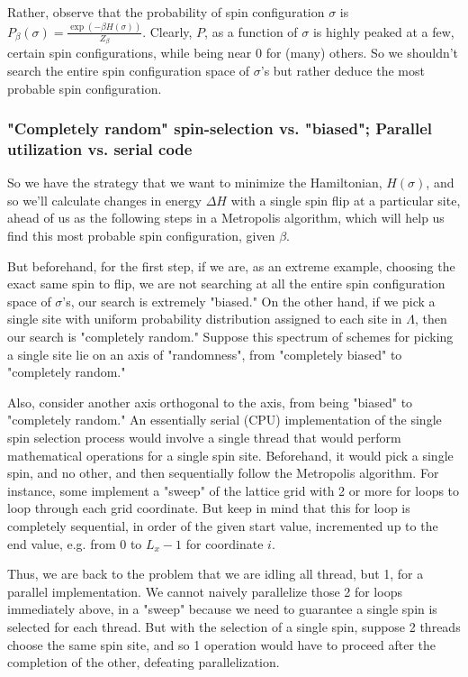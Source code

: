 \documentclass[10pt]{amsart}
\begin{document}
\begin{multicols*}{2}
Rather, observe that the probability of spin configuration $\sigma$ is $P_{\beta}(\sigma) = \frac{\exp{ (-\beta H(\sigma))} }{ Z_{\beta}}$.  Clearly, $P$, as a function of $\sigma$ is highly peaked at a few, certain spin configurations, while being near 0 for (many) others.  So we shouldn't search the entire spin configuration space of $\sigma$'s but rather deduce the most probable spin configuration.  

\subsubsection{"Completely random" spin-selection vs. "biased"; Parallel utilization vs. serial code}

So we have the strategy that we want to minimize the Hamiltonian, $H(\sigma)$, and so we'll calculate changes in energy $\Delta H$ with a single spin flip at a particular site, ahead of us as the following steps in a Metropolis algorithm, which will help us find this most probable spin configuration, given $\beta$.  

But beforehand, for the first step, if we are, as an extreme example, choosing the exact same spin to flip, we are not searching at all the entire spin configuration space of $\sigma$'s, our search is extremely "biased."  On the other hand, if we pick a single site with uniform probability distribution assigned to each site in $\Lambda$, then our search is "completely random."  Suppose this spectrum of schemes for picking a single site lie on an axis of "randomness", from "completely biased" to "completely random."  

Also, consider another axis orthogonal to the axis, from being "biased" to "completely random."  An essentially serial (CPU) implementation of the single spin selection process would involve a single thread that would perform mathematical operations for a single spin site.  Beforehand, it would pick a single spin, and no other, and then sequentially follow the Metropolis algorithm.  For instance, some implement a "sweep" of the lattice grid with 2 or more for loops to loop through each grid coordinate.  But keep in mind that this for loop is completely sequential, in order of the given start value, incremented up to the end value, e.g. from $0$ to $L_x-1$ for coordinate $i$.  

Thus, we are back to the problem that we are idling all thread, but 1, for a parallel implementation.  We cannot naively parallelize those 2 for loops immediately above, in a "sweep" because we need to guarantee a single spin is selected for each thread.  But with the selection of a single spin, suppose 2 threads choose the same spin site, and so 1 operation would have to proceed after the completion of the other, defeating parallelization.  


\end{multicols*}
\end{document}
